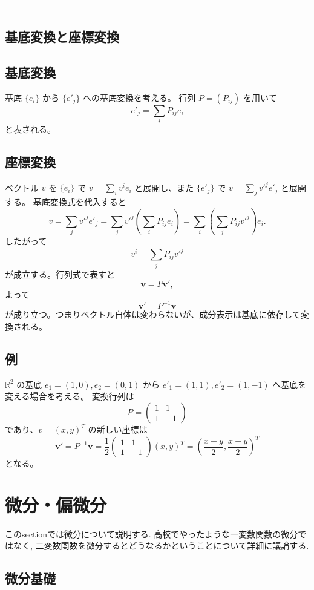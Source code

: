 \documentclass{ltjsarticle}
\begin{document}
---

\subsection{基底変換と座標変換}
\subsection{基底変換}
基底 $\{e_i\}$ から $\{e'_j\}$ への基底変換を考える。
行列 $P=(P_{ij})$ を用いて
\[
e'_j=\sum_i P_{ij} e_i
\]
と表される。

\subsection{座標変換}
ベクトル $v$ を $\{e_i\}$ で $v=\sum_i v^i e_i$ と展開し、また $\{e'_j\}$ で $v=\sum_j v'^j e'_j$ と展開する。
基底変換式を代入すると
\[
v=\sum_j v'^j e'_j = \sum_j v'^j \left(\sum_i P_{ij} e_i\right) = \sum_i \left(\sum_j P_{ij} v'^j\right) e_i.
\]
したがって
\[
v^i=\sum_j P_{ij} v'^j
\]
が成立する。行列式で表すと
\[
\bm{v}=P\bm{v}',
\]
よって
\[
\bm{v}'=P^{-1}\bm{v}
\]
が成り立つ。つまりベクトル自体は変わらないが、成分表示は基底に依存して変換される。

\subsection{例}
$\mathbb{R}^2$ の基底 $e_1=(1,0),e_2=(0,1)$ から $e'_1=(1,1),e'_2=(1,-1)$ へ基底を変える場合を考える。
変換行列は
\[
P=\begin{pmatrix}1&1\\1&-1\end{pmatrix}
\]
であり、$v=(x,y)^T$ の新しい座標は
\[
\bm{v}'=P^{-1}\bm{v}=\frac{1}{2}\begin{pmatrix}1&1\\1&-1\end{pmatrix}(x,y)^T
=\left(\frac{x+y}{2},\frac{x-y}{2}\right)^T
\]
となる。

\section{微分・偏微分}
このsectionでは微分について説明する. 
高校でやったような一変数関数の微分ではなく, 二変数関数を微分するとどうなるかということについて詳細に議論する. 

\subsection{微分基礎}
\end{document}
